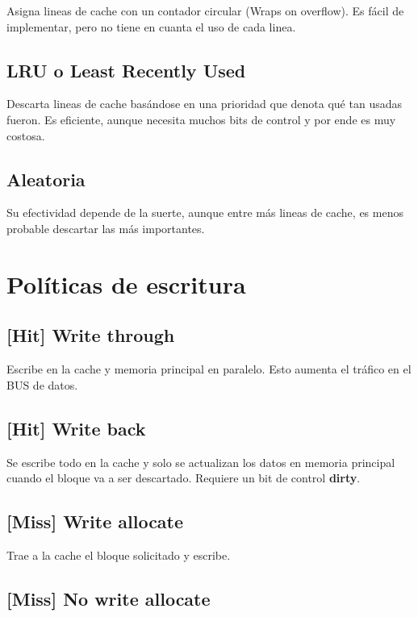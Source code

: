\documentclass{article}
\begin{document}
\begin{multicols}{2}
		Asigna lineas de cache con un contador circular (Wraps on overflow). Es fácil de implementar, pero no tiene en cuanta el uso de cada linea.
		
		\subsection{LRU o Least Recently Used}
		
		Descarta lineas de cache basándose en una prioridad que denota qué tan usadas fueron. Es eficiente, aunque necesita muchos bits de control y por ende es muy costosa.
		
		\subsection{Aleatoria}
		
		Su efectividad depende de la suerte, aunque entre más lineas de cache, es menos probable descartar las más importantes.
		
		\section{Políticas de escritura}
		
		\subsection{[Hit] Write through}
		
		Escribe en la cache y memoria principal en paralelo. Esto aumenta el tráfico en el BUS de datos.
		
		\subsection{[Hit] Write back}
		
		Se escribe todo en la cache y solo se actualizan los datos en memoria principal cuando el bloque va a ser descartado. Requiere un bit de control \textbf{dirty}.
		
		\subsection{[Miss] Write allocate}
		
		Trae a la cache el bloque solicitado y escribe.
		
		\subsection{[Miss] No write allocate}
		

\end{multicols}
\end{document}
